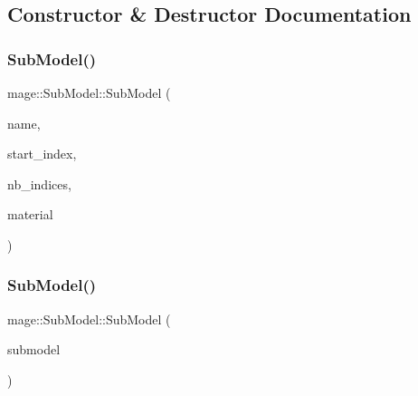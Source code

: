 \subsection{Constructor \& Destructor Documentation}
\hypertarget{classmage_1_1_sub_model_a26dce7b076af1edb4209d0a236a250ef}{}\label{classmage_1_1_sub_model_a26dce7b076af1edb4209d0a236a250ef} 
\subsubsection{\texorpdfstring{Sub\+Model()}{SubModel()}\hspace{0.1cm}{\footnotesize\ttfamily [1/3]}}
{\footnotesize\ttfamily mage\+::\+Sub\+Model\+::\+Sub\+Model (\begin{DoxyParamCaption}\item[{const string \&}]{name,  }\item[{size\+\_\+t}]{start\+\_\+index,  }\item[{size\+\_\+t}]{nb\+\_\+indices,  }\item[{const \hyperlink{structmage_1_1_shaded_material}{Shaded\+Material} \&}]{material }\end{DoxyParamCaption})}

\hypertarget{classmage_1_1_sub_model_ae71dcb72fc1b06710b390c97a2db1d68}{}\label{classmage_1_1_sub_model_ae71dcb72fc1b06710b390c97a2db1d68} 
\subsubsection{\texorpdfstring{Sub\+Model()}{SubModel()}\hspace{0.1cm}{\footnotesize\ttfamily [2/3]}}
{\footnotesize\ttfamily mage\+::\+Sub\+Model\+::\+Sub\+Model (\begin{DoxyParamCaption}\item[{const \hyperlink{classmage_1_1_sub_model}{Sub\+Model} \&}]{submodel }\end{DoxyParamCaption})}

\hypertarget{classmage_1_1_sub_model_a3813e71a2904ee9edf3e3788d96eb2c7}{}\label{classmage_1_1_sub_model_a3813e71a2904ee9edf3e3788d96eb2c7} 
